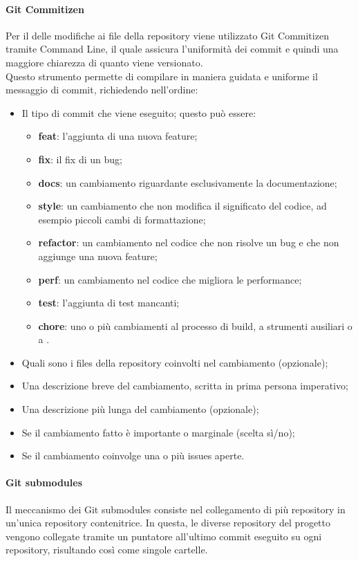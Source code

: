 \documentclass[../norme-di-progetto.tex]{subfiles}
\begin{document}
\paragraph{Git Commitizen}
Per il  delle modifiche ai file della repository viene utilizzato Git Commitizen tramite Command Line, il quale assicura l'uniformità dei commit e quindi una maggiore chiarezza di quanto viene versionato. \\ Questo strumento permette di compilare in maniera guidata e uniforme il messaggio di commit, richiedendo nell'ordine:
\begin{itemize}
  \item Il tipo di commit che viene eseguito; questo può essere:
  \begin{itemize}
    \item \textbf{feat}: l'aggiunta di una nuova feature;
    \item \textbf{fix}: il fix di un bug;
    \item \textbf{docs}: un cambiamento riguardante esclusivamente la documentazione;
    \item \textbf{style}: un cambiamento che non modifica il significato del codice, ad esempio piccoli cambi di formattazione;
    \item \textbf{refactor}: un cambiamento nel codice che non risolve un bug e che non aggiunge una nuova feature;
    \item \textbf{perf}: un cambiamento nel codice che migliora le performance;
    \item \textbf{test}: l'aggiunta di test mancanti;
    \item \textbf{chore}: uno o più cambiamenti al processo di build, a strumenti ausiliari o a .
  \end{itemize}
  \item Quali sono i files della repository coinvolti nel cambiamento (opzionale);
  \item Una descrizione breve del cambiamento, scritta in prima persona imperativo;
  \item Una descrizione più lunga del cambiamento (opzionale);
  \item Se il cambiamento fatto è importante o marginale (scelta sì/no);
  \item Se il cambiamento coinvolge una o più issues aperte.
\end{itemize}
\paragraph{Git submodules}
Il meccanismo dei Git submodules consiste nel collegamento di più repository in un'unica repository contenitrice. In questa, le diverse repository del progetto vengono collegate tramite un puntatore all'ultimo commit eseguito su ogni repository, risultando così come singole cartelle.
\end{document}

